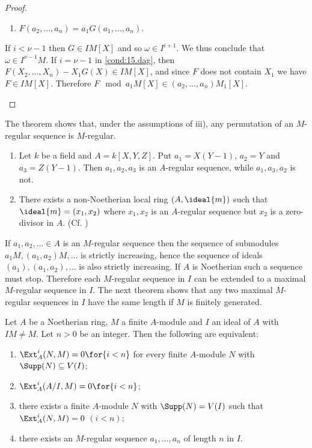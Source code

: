 \documentclass[../main]{subfiles}
\begin{document}
\begin{proof}
\begin{enumerate}
    \begin{enumerate}[label = (15.$\dagger$)]
       \item $F(a_2, \ldots, a_n)=a_1 G(a_1, \ldots, a_n)$.\label{cond:15.dag}
    \end{enumerate}
    If $i<\nu-1$ then $G \in IM[X]$ and so $\omega \in I^{i+1}$. We thus conclude that $\omega \in I^{\nu-1} M$. If $i=\nu-1$ in \ref{cond:15.dag}, then $F(X_2, \ldots, X_n)-X_1 G(X)\in IM[X]$, and since $F$ does not contain $X_1$ we have $F \in IM[X]$. Therefore $F \mod a_1 M[X] \in(a_2, \ldots, a_n) M_1[X]$.
\end{enumerate}
\end{proof}

The theorem shows that, under the assumptions of iii), any permutation of an $M$-regular sequence is $M$-regular.

\begin{examples*}
\begin{enumerate}
    \item Let $k$ be a field and $A=k[X, Y, Z]$. Put $a_1=X(Y-1)$, $a_2=Y$ and $a_3=Z(Y-1)$. Then $a_1, a_2, a_3$ is an $A$-regular sequence, while $a_1, a_3, a_2$ is not.
    \item There exists a non-Noetherian local ring $(A, \ideal{m})$ such that $\ideal{m}=(x_1, x_2)$ where $x_1, x_2$ is an $A$-regular sequence but $x_2$ is a zero-divisor in $A$. (Cf. \cite{dieudonne1966on})
\end{enumerate} 
\end{examples*}

\newparagraph If $a_1, a_2, \ldots \in A$ is an $M$-regular sequence then the sequence of submodules $a_1M,(a_1, a_2) M, \ldots$ is strictly increasing, hence the sequence of ideals $(a_1),(a_1, a_2), \ldots$ is also strictly increasing. If $A$ is Noetherian such a sequence must stop. Therefore each $M$-regular sequence in $I$ can be extended to a maximal $M$-regular sequence in $I$. The next theorem shows that any two maximal $M$-regular sequences in $I$ have the same length if $M$ is finitely generated.

\begin{theorem}\label{thm:028}
Let $A$ be a Noetherian ring, $M$ a finite $A$-module and $I$ an ideal of $A$ with $I M \neq M$. Let $n>0$ be an integer. Then the following are equivalent:
\begin{enumerate}[label=(\arabic*)]
    \item $\Ext_A^i(N, M)=0\for{i<n}$ for every finite $A$-module $N$ with $\Supp(N) \subseteq V(I)$;
    \item $\Ext_A^i(A / I, M)=0\for{i<n}$;
    \item there exists a finite $A$-module $N$ with $\Supp(N)=V(I)$ such that \newline $\Ext_A^i(N, M)=0$ $(i<n)$;
    \item there exists an $M$-regular sequence $a_1, \ldots, a_n$ of length $n$ in $I$.
\end{enumerate} 
\end{theorem}
\end{document}
